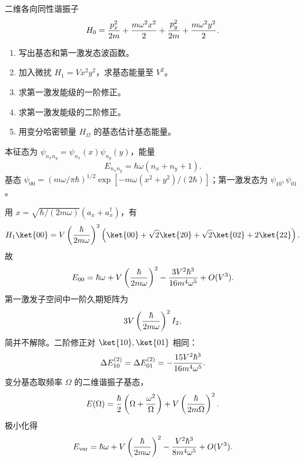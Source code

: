 
\begin{question}
二维各向同性谐振子
\[
H_0={p_x^2\over2m}+{m\omega^2x^2\over2}+{p_y^2\over2m}+{m\omega^2y^2\over2}.
\]
\begin{enumerate}
  \item 写出基态和第一激发态波函数。
  \item 加入微扰 $H_1=Vx^2y^2$，求基态能量至 $V^2$。
  \item 求第一激发能级的一阶修正。
  \item 求第一激发能级的二阶修正。
  \item 用变分哈密顿量 $H_\Omega$ 的基态估计基态能量。
\end{enumerate}
\begin{solution}
本征态为 $\psi_{n_xn_y}=\psi_{n_x}(x)\psi_{n_y}(y)$，能量
\[
  E_{n_xn_y}=\hbar\omega(n_x+n_y+1).
\]
基态 $\psi_{00}=(m\omega/\pi\hbar)^{1/2}\exp[-m\omega(x^2+y^2)/(2\hbar)]$；第一激发态为 $\psi_{10},\psi_{01}$。

用 $x=\sqrt{\hbar/(2m\omega)}(a_x+a_x^\dagger)$，有
\[
  H_1\ket{00}=V\left({\hbar\over2m\omega}\right)^2
  \left(\ket{00}+\sqrt2\ket{20}+\sqrt2\ket{02}+2\ket{22}\right).
\]
故
\[
  E_{00}= \hbar\omega
  +V\left({\hbar\over2m\omega}\right)^2
  -{3V^2\hbar^3\over16m^4\omega^5}+O(V^3).
\]
第一激发子空间中一阶久期矩阵为
\[
  3V\left({\hbar\over2m\omega}\right)^2 I_2,
\]
简并不解除。二阶修正对 $\ket{10},\ket{01}$ 相同：
\[
  \Delta E_{10}^{(2)}=\Delta E_{01}^{(2)}
  =-{15V^2\hbar^3\over16m^4\omega^5}.
\]
变分基态取频率 $\Omega$ 的二维谐振子基态，
\[
  E(\Omega)={\hbar\over2}\left(\Omega+{\omega^2\over\Omega}\right)
  +V\left({\hbar\over2m\Omega}\right)^2 .
\]
极小化得
\[
  E_{\rm var}=\hbar\omega+V\left({\hbar\over2m\omega}\right)^2
  -{V^2\hbar^3\over8m^4\omega^5}+O(V^3).
\]
\end{solution}
\end{question}


